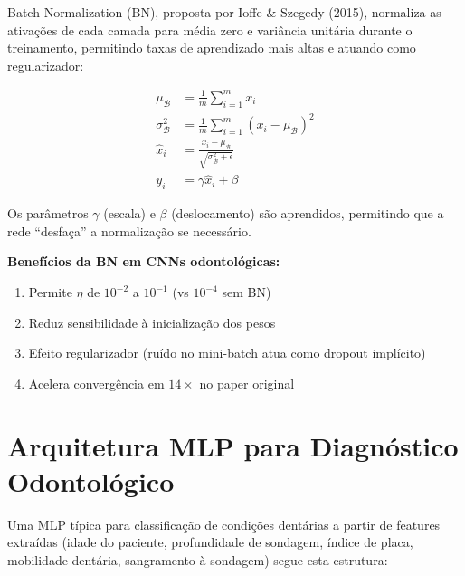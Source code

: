 Batch Normalization (BN), proposta por Ioffe \& Szegedy (2015), normaliza as
ativações de cada camada para média zero e variância unitária durante o treinamento,
permitindo taxas de aprendizado mais altas e atuando como regularizador:

\begin{align}
  \mu_{\mathcal{B}} &= \frac{1}{m} \sum_{i=1}^{m} x_i \label{eq:bn-mean} \\
  \sigma_{\mathcal{B}}^2 &= \frac{1}{m} \sum_{i=1}^{m} (x_i - \mu_{\mathcal{B}})^2 \label{eq:bn-var} \\
  \hat{x}_i &= \frac{x_i - \mu_{\mathcal{B}}}{\sqrt{\sigma_{\mathcal{B}}^2 + \epsilon}} \label{eq:bn-norm} \\
  y_i &= \gamma \hat{x}_i + \beta \label{eq:bn-scale}
\end{align}

Os parâmetros $\gamma$ (escala) e $\beta$ (deslocamento) são aprendidos,
permitindo que a rede ``desfaça'' a normalização se necessário.

\textbf{Benefícios da BN em CNNs odontológicas:}
\begin{enumerate}
  \item Permite $\eta$ de $10^{-2}$ a $10^{-1}$ (vs $10^{-4}$ sem BN)
  \item Reduz sensibilidade à inicialização dos pesos
  \item Efeito regularizador (ruído no mini-batch atua como dropout implícito)
  \item Acelera convergência em $14\times$ no paper original
\end{enumerate}


\section{Arquitetura MLP para Diagnóstico Odontológico}
\label{sec:mlp-odonto}

Uma MLP típica para classificação de condições dentárias a partir de features
extraídas (idade do paciente, profundidade de sondagem, índice de placa,
mobilidade dentária, sangramento à sondagem) segue esta estrutura:

